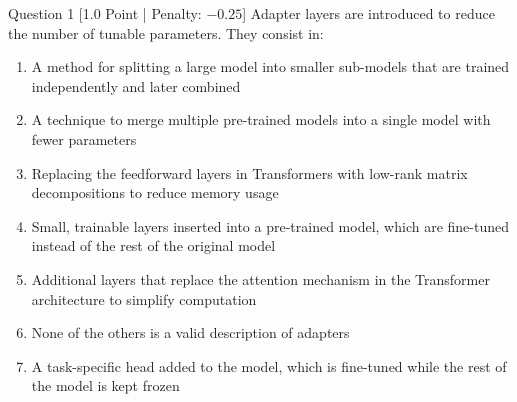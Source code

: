 \documentclass[11pt,a4paper]{article}
\begin{document}
\begin{questionbox}{Question 1 \hfill [1.0 Point | Penalty: $-0.25$]}
Adapter layers are introduced to reduce the number of tunable parameters. They consist in:
\begin{enumerate}[label=\alph*.,leftmargin=2em,itemsep=2pt]
    \item A method for splitting a large model into smaller sub-models that are trained independently and later combined
    \item A technique to merge multiple pre-trained models into a single model with fewer parameters
    \item Replacing the feedforward layers in Transformers with low-rank matrix decompositions to reduce memory usage
    \item Small, trainable layers inserted into a pre-trained model, which are fine-tuned instead of the rest of the original model
    \item Additional layers that replace the attention mechanism in the Transformer architecture to simplify computation
    \item None of the others is a valid description of adapters
    \item A task-specific head added to the model, which is fine-tuned while the rest of the model is kept frozen
\end{enumerate}
\end{questionbox}

\vspace{0.3cm}
\end{document}
